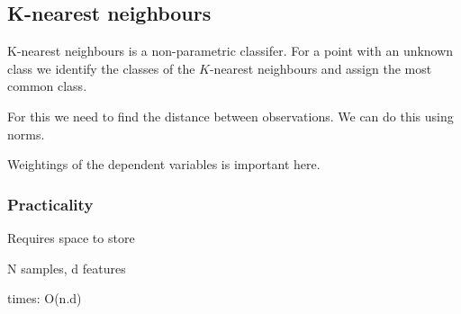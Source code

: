 
\subsection{K-nearest neighbours}

K-nearest neighbours is a non-parametric classifer. For a point with an unknown class we identify the classes of the \(K\)-nearest neighbours and assign the most common class.

For this we need to find the distance between observations. We can do this using norms.

Weightings of the dependent variables is important here.

\subsubsection{Practicality}

Requires space to store

N samples, d features

times: O(n.d)

